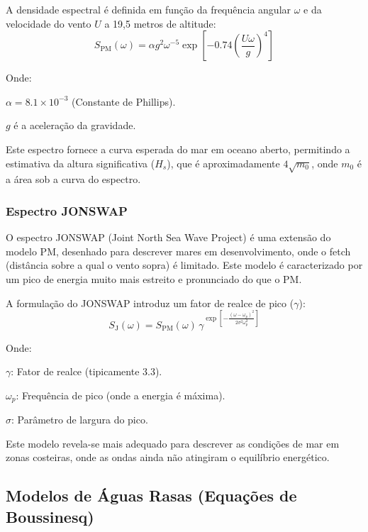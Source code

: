 \documentclass[11pt,a4paper]{article}
\begin{document}
A densidade espectral é definida em função da frequência angular $\omega$ e da velocidade do vento $U$ a 19,5 metros de altitude:
\begin{equation*}
     S_{\mathrm{PM}}(\omega)=\alpha g^2 \omega^{-5} \exp\left[-0.74\left(\frac{U\omega}{g}\right)^4\right]
\end{equation*}

Onde:

     $\alpha=8.1\times 10^{-3}$ (Constante de Phillips).

    $g$ é a aceleração da gravidade.

Este espectro fornece a curva esperada do mar em oceano aberto, permitindo a estimativa da altura significativa ($H_s$), que é aproximadamente $4\sqrt{m_0}$, onde $m_0$ é a área sob a curva do espectro.

\subsubsection{Espectro JONSWAP}

O espectro JONSWAP (Joint North Sea Wave Project) \parencite{hasselmann1973measurements} é uma extensão do modelo PM, desenhado para descrever mares em desenvolvimento, onde o fetch (distância sobre a qual o vento sopra) é limitado. Este modelo é caracterizado por um pico de energia muito mais estreito e pronunciado do que o PM.

A formulação do JONSWAP introduz um fator de realce de pico ($\gamma$):
\begin{equation*}
      S_{\mathrm{J}}(\omega)=S_{\mathrm{PM}}(\omega)\,\gamma^{\exp\left[-\frac{(\omega-\omega_p)^2}{2\sigma^2\omega_p^2}\right]}
\end{equation*}

Onde:

     $\gamma$: Fator de realce (tipicamente 3.3).

     $\omega_p$: Frequência de pico (onde a energia é máxima).

     $\sigma$: Parâmetro de largura do pico.
    
Este modelo revela-se mais adequado para descrever as condições de mar em zonas costeiras, onde as ondas ainda não atingiram o equilíbrio energético.

\subsection{Modelos de Águas Rasas (Equações de Boussinesq)}
\end{document}
